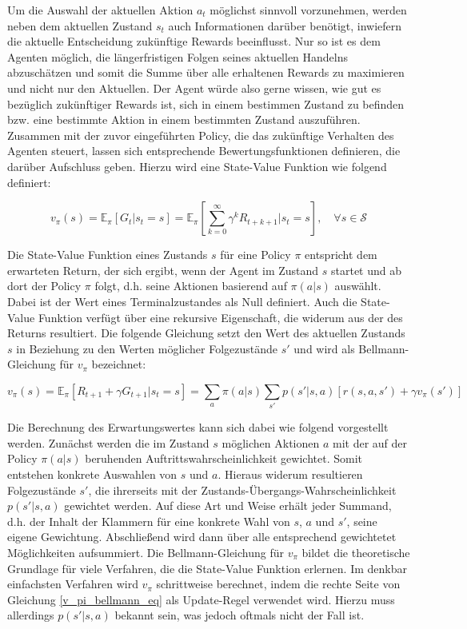 Um die Auswahl der aktuellen Aktion $a_t$ möglichst sinnvoll vorzunehmen, werden neben dem aktuellen Zustand $s_t$ auch Informationen darüber benötigt, inwiefern die aktuelle Entscheidung zukünftige Rewards beeinflusst. Nur so ist es dem Agenten möglich, die längerfristigen Folgen seines aktuellen Handelns abzuschätzen und somit die Summe über alle erhaltenen Rewards zu maximieren und nicht nur den Aktuellen. Der Agent würde also gerne wissen, \glqq wie gut \grqq{} es bezüglich zukünftiger Rewards ist, sich in einem bestimmen Zustand zu befinden bzw. eine bestimmte Aktion in einem bestimmten Zustand auszuführen. Zusammen mit der zuvor eingeführten Policy, die das zukünftige Verhalten des Agenten steuert, lassen sich entsprechende Bewertungsfunktionen definieren, die darüber Aufschluss geben. Hierzu wird eine State-Value Funktion wie folgend definiert:

\begin{equation}
  v_\pi(s) = \mathbb{E}_\pi[G_t|s_t=s] = \mathbb{E}_\pi[\sum_{k=0}^{\infty} \gamma^k R_{t+k+1} | s_t=s], \quad \forall s \in \mathcal{S}
  \label{v_pi_eq}
\end{equation}

Die State-Value Funktion eines Zustands $s$ für eine Policy $\pi$ entspricht dem erwarteten Return, der sich ergibt, wenn der Agent im Zustand $s$ startet und ab dort der Policy $\pi$ folgt, d.h. seine Aktionen basierend auf $\pi(a|s)$ auswählt. Dabei ist der Wert eines Terminalzustandes als Null definiert. Auch die State-Value Funktion verfügt über eine rekursive Eigenschaft, die widerum aus der des Returns resultiert. Die folgende Gleichung setzt den Wert des aktuellen Zustands $s$ in Beziehung zu den Werten möglicher Folgezustände $s'$ und wird als Bellmann-Gleichung für $v_\pi$ bezeichnet:

\begin{equation}
  v_\pi(s) = \mathbb{E}_\pi[R_{t+1} + \gamma G_{t+1} | s_t=s] = \sum_{a} \pi(a|s) \sum_{s'} p(s'|s,a) [r(s,a,s') + \gamma v_\pi(s')]
  \label{v_pi_bellmann_eq}
\end{equation}

Die Berechnung des Erwartungswertes kann sich dabei wie folgend vorgestellt werden. Zunächst werden die im Zustand $s$ möglichen Aktionen $a$ mit der auf der Policy $\pi(a|s)$ beruhenden Auftrittswahrscheinlichkeit gewichtet. Somit entstehen konkrete Auswahlen von $s$ und $a$. Hieraus widerum resultieren Folgezustände $s'$, die ihrerseits mit der Zustands-Übergangs-Wahrscheinlichkeit $p(s'|s,a)$ gewichtet werden. Auf diese Art und Weise erhält jeder Summand, d.h. der Inhalt der Klammern für eine konkrete Wahl von $s$, $a$ und $s'$, seine eigene Gewichtung. Abschließend wird dann über alle entsprechend gewichtetet Möglichkeiten aufsummiert. Die Bellmann-Gleichung für $v_\pi$ bildet die theoretische Grundlage für viele Verfahren, die die State-Value Funktion erlernen. Im denkbar einfachsten Verfahren wird $v_\pi$ schrittweise berechnet, indem die rechte Seite von Gleichung \eqref{v_pi_bellmann_eq} als Update-Regel verwendet wird. Hierzu muss allerdings $p(s'|s,a)$ bekannt sein, was jedoch oftmals nicht der Fall ist. \\

